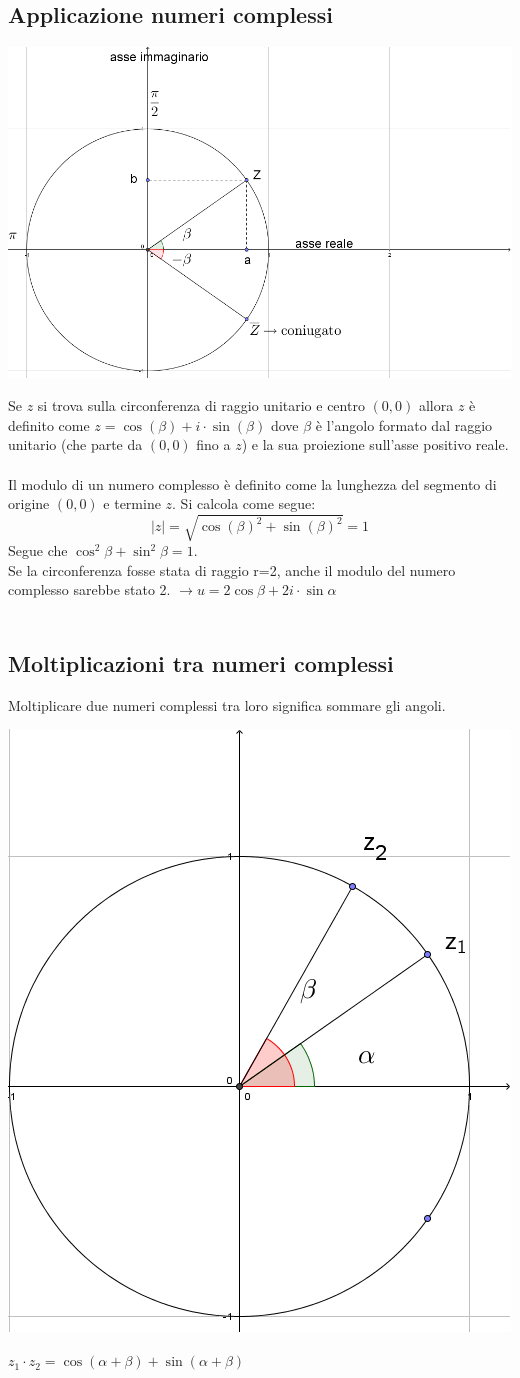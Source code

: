 \documentclass[italian]{article}
\begin{document}
\subsection{Applicazione numeri complessi}
\begin{center}
	\includegraphics[width=0.5\linewidth]{img/numeri_compessi}	
\end{center}
Se $z$ si trova sulla circonferenza di raggio unitario e centro $(0,0)$ allora $z$ è definito come $z=\cos (\beta)+i\cdot \sin (\beta)$ dove $\beta$ è l'angolo formato dal raggio unitario (che parte da $(0,0)$ fino a $z$) e la sua proiezione sull'asse positivo reale. \\\\
Il modulo di un numero complesso è definito come la lunghezza del segmento di origine $(0,0)$ e termine $z$. Si calcola come segue:
\[
	|z|=\sqrt{\cos (\beta)^2 + \sin (\beta)^2} = 1
\]
Segue che $\cos ^2 \beta + \sin ^2 \beta = 1$. \\
Se la circonferenza fosse stata di raggio r=2, anche il modulo del numero complesso sarebbe stato 2. $\to u=2\cos \beta + 2i \cdot \sin \alpha$\\\\
\subsection{Moltiplicazioni tra numeri complessi}
Moltiplicare due numeri complessi tra loro significa sommare gli angoli.
\begin{center}
	\includegraphics[width=0.3\linewidth]{img/numeri_compessi_1.png}	
\end{center}
$z_1 \cdot z_2 = \cos (\alpha + \beta) + \sin (\alpha + \beta)$\\\\
\pagebreak
\end{document}
